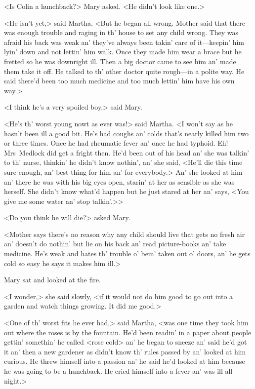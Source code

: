 <Is Colin a hunchback?> Mary asked. <He didn't look like one.>

<He isn't yet,> said Martha. <But he began all wrong. Mother said that there was enough trouble and raging in th' house to set any child wrong. They was afraid his back was weak an' they've always been takin' care of it—keepin' him lyin' down and not lettin' him walk. Once they made him wear a brace but he fretted so he was downright ill. Then a big doctor came to see him an' made them take it off. He talked to th' other doctor quite rough—in a polite way. He said there'd been too much medicine and too much lettin' him have his own way.>

<I think he's a very spoiled boy,> said Mary.

<He's th' worst young nowt as ever was!> said Martha. <I won't say as he hasn't been ill a good bit. He's had coughs an' colds that's nearly killed him two or three times. Once he had rheumatic fever an' once he had typhoid. Eh! Mrs~Medlock did get a fright then. He'd been out of his head an' she was talkin' to th' nurse, thinkin' he didn't know nothin', an' she said, <He'll die this time sure enough, an' best thing for him an' for everybody.> An' she looked at him an' there he was with his big eyes open, starin' at her as sensible as she was herself. She didn't know what'd happen but he just stared at her an' says, <You give me some water an' stop talkin'.>>

<Do you think he will die?> asked Mary.

<Mother says there's no reason why any child should live that gets no fresh air an' doesn't do nothin' but lie on his back an' read picture-books an' take medicine. He's weak and hates th' trouble o' bein' taken out o' doors, an' he gets cold so easy he says it makes him ill.>

Mary sat and looked at the fire.

<I wonder,> she said slowly, <if it would not do him good to go out into a garden and watch things growing. It did me good.>

<One of th' worst fits he ever had,> said Martha, <was one time they took him out where the roses is by the fountain. He'd been readin' in a paper about people gettin' somethin' he called <rose cold> an' he began to sneeze an' said he'd got it an' then a new gardener as didn't know th' rules passed by an' looked at him curious. He threw himself into a passion an' he said he'd looked at him because he was going to be a hunchback. He cried himself into a fever an' was ill all night.>

